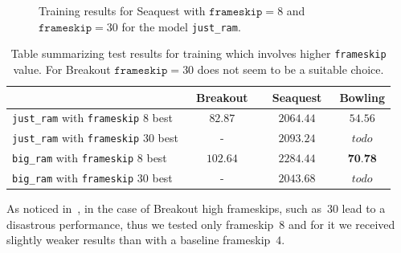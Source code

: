 \begin{figure}[h]
\centering
{}
\caption{Training results for Seaquest with 
$\texttt{frameskip} = 8$ and  $\texttt{frameskip} = 30$ for the model \texttt{just\_ram}.}
\label{fig:seaquest-frameskip}
\end{figure}

\begin{table}[h]
\centering
\begin{tabularx}{0.9\textwidth}{ X c c c }
  \toprule
   &\ Breakout\ &\ Seaquest\ & Bowling \\
  \midrule
  \texttt{just\_ram} with \texttt{frameskip} $8$ best & $82.87$  & $2064.44$ & $54.56$\\
  \texttt{just\_ram} with \texttt{frameskip} $30$ best & -  & $2093.24$ & $todo$\\
  \texttt{big\_ram} with \texttt{frameskip} $8$ best & $102.64$ & $2284.44$ & $\textbf{70.78}$ \\
  \texttt{big\_ram} with \texttt{frameskip} $30$ best & - & $2043.68$ & $todo$\\
  \bottomrule
\end{tabularx}
\caption{Table summarizing test results for training which involves higher \texttt{frameskip} value. For Breakout $\texttt{frameskip} 
=30$ does not seem to be a suitable choice.}
\label{table:results-frameskip}
\end{table}


As noticed in~\cite{frameskip}, in the case of Breakout high frameskips, such as~$30$ lead to a disastrous performance, thus we tested only frameskip~$8$ and for it we received slightly weaker results than with a baseline frameskip~$4$.

